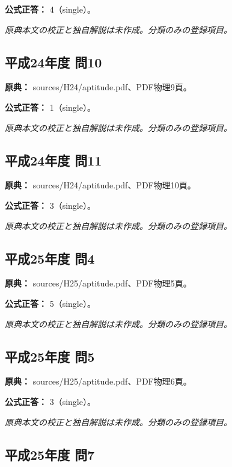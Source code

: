 \textbf{公式正答：} 4（single）。

\par\textit{原典本文の校正と独自解説は未作成。分類のみの登録項目。}

\subsection{平成24年度 問10}
\label{q:h24-reg-apt-10}

\noindent\textbf{原典：} sources/H24/aptitude.pdf、PDF物理9頁。

\textbf{公式正答：} 1（single）。

\par\textit{原典本文の校正と独自解説は未作成。分類のみの登録項目。}

\subsection{平成24年度 問11}
\label{q:h24-reg-apt-11}

\noindent\textbf{原典：} sources/H24/aptitude.pdf、PDF物理10頁。

\textbf{公式正答：} 3（single）。

\par\textit{原典本文の校正と独自解説は未作成。分類のみの登録項目。}

\subsection{平成25年度 問4}
\label{q:h25-reg-apt-04}

\noindent\textbf{原典：} sources/H25/aptitude.pdf、PDF物理5頁。

\textbf{公式正答：} 5（single）。

\par\textit{原典本文の校正と独自解説は未作成。分類のみの登録項目。}

\subsection{平成25年度 問5}
\label{q:h25-reg-apt-05}

\noindent\textbf{原典：} sources/H25/aptitude.pdf、PDF物理6頁。

\textbf{公式正答：} 3（single）。

\par\textit{原典本文の校正と独自解説は未作成。分類のみの登録項目。}

\subsection{平成25年度 問7}
\label{q:h25-reg-apt-07}

